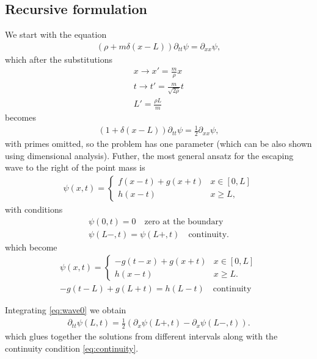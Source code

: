 \documentclass[
a4paper,%
10pt,%
titlepage,%
twoside%
]{article}
\begin{document}
\subsection{Recursive formulation}
We start with the equation
\begin{gather}
  \label{eq:wave0}
  (\rho+m\delta(x-L))\partial_{tt}\psi=\partial_{xx}\psi,
\end{gather}
which after the substitutions
\begin{gather}
  \label{eq:subs0}
  x\rightarrow x'=\frac{m}{\rho} x         \\
  t\rightarrow t'=\frac{m}{\sqrt{2\rho}} t \\
  L'=\frac{\rho L}{m}
\end{gather}
becomes
\begin{gather}
  \label{eq:wave1}
  (1+\delta(x-L))\partial_{tt}\psi=\frac{1}{2}\partial_{xx}\psi,
\end{gather}
with primes omitted, so the problem has one parameter (which can be
also shown using dimensional analysis). Futher, the most general
ansatz for the escaping wave to the right of the point mass is
\begin{gather}
  \label{eq:ansatz0}
  \psi(x,t)=
  \begin{cases}
    f(x-t)+g(x+t) & x\in[0,L] \\
    h(x-t)        & x\ge L,
  \end{cases}
\end{gather}
with conditions
\begin{gather}
  \label{eq:boundary}
  \psi(0,t) = 0\quad\text{zero at the boundary}\\
  \label{eq:continuity}
  \psi(L-,t)=\psi(L+,t)\quad\text{continuity}.
\end{gather}
which become
\begin{gather}
  \label{eq:ansatz1}
  \psi(x,t)=
  \begin{cases}
    -g(t-x)+g(x+t) & x\in[0,L] \\
    h(x-t)         & x\ge L.
  \end{cases}\\
  \label{eq:cont0}
  -g(t-L)+g(L+t)=h(L-t)\quad\text{continuity}
\end{gather}

Integrating \eqref{eq:wave0} we obtain
\begin{gather}
  \partial_{tt}\psi(L,t)=\frac{1}{2}(\partial_x\psi(L+,t)-\partial_x\psi(L-,t)).
\end{gather}
which glues together the solutions from different intervals along with
the continuity condition \eqref{eq:continuity}.
\end{document}
